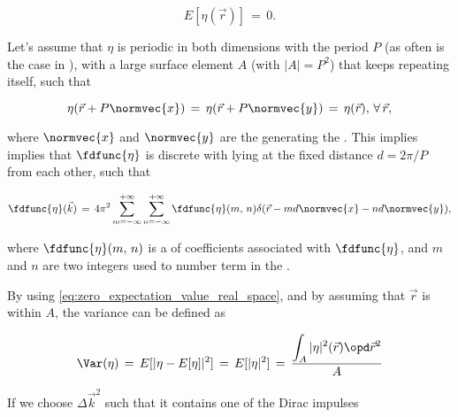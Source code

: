 {\begin{equation} \label{eq:zero_expectation_value_real_space}
E[\eta(\vec{r})] \,=\, 0.
\end{equation}

Let's assume that $\eta$ is periodic in both dimensions with the period $P$ (as often is the case in ), with a large surface element $A$ (with \mbox{$|A| = P^2$}) that keeps repeating itself, such that

\begin{equation} \label{eq:water_surface_periodicity}
\eta(\vec{r}+P\normvec{x}) \,=\, \eta(\vec{r}+P\normvec{y}) \,=\, \eta(\vec{r}),\,\forall\,\vec{r},
\end{equation}

where $\normvec{x}$ and $\normvec{y}$ are the  generating the . This implies implies that $\fdfunc{\eta}$ is discrete with  lying at the fixed distance $d = 2\pi/P$ from each other, such that

\begin{equation}
\fdfunc{\eta}(\vec{k}) \,=\, 4\pi^2\sum_{m=-\infty}^{+\infty}\sum_{n=-\infty}^{+\infty} \fdfunc{\eta}(m,\,n)\delta(\vec{r} - md\normvec{x} - nd\normvec{y}),
\end{equation}

where $\fdfunc{\eta}(m,\,n)$ is a \twodimensional \sequence of coefficients associated with $\fdfunc{\eta}$, and $m$ and $n$ are two integers used to number term in the \series.

By using \eqref{eq:zero_expectation_value_real_space}, and by assuming that $\vec{r}$ is  within $A$, the variance can be defined as

\begin{equation}
\Var(\eta) \,=\, E[|\eta - E[\eta]|^2] \,=\, E[|\eta|^2] \,=\, \frac{\displaystyle \int_A|\eta|^2(\vec{r})\opd\vec{r}^2}{A}
\end{equation}

\HRule

If we choose $\Delta\vec{k}^2$ such that it contains one of the Dirac impulses




















}
